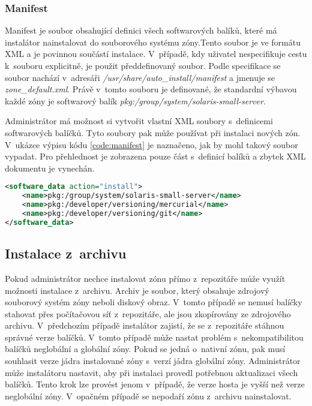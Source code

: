 \subsubsection{Manifest}
\label{chapter:zones:instalation:repozitory:manifest}
Manifest je soubor obsahující definici všech softwarových balíků, které má instalátor nainstalovat do souborového systému zóny.Tento
soubor je ve formátu XML a je povinnou součástí instalace.  V~případě, kdy uživatel nespecifikuje cestu k~souboru explicitně, je použit
předdefinovaný soubor. Podle specifikace \cite{oracle:solaris:zones:manifest} se soubor nachází v~adresáři \textit{/usr/share/auto\_install/manifest}
a jmenuje se \textit{zone\_default.xml}. Právě v~tomto souboru je definované, že standardní výbavou každé zóny je softwarový
balík \textit{pkg:/group/system/solaris-small-server}.

Administrátor má možnost si vytvořit vlastní XML soubory s~definicemi softwarových balíčků. Tyto soubory pak může používat
při instalaci nových zón. V~ukázce výpisu kódu \ref{code:manifest} je naznačeno, jak by mohl takový soubor vypadat.
Pro přehlednost je zobrazena pouze část s~definicí balíků a zbytek XML dokumentu je vynechán.
\begin{lstlisting}[language={XML}, caption={Ukázkový manifest}, label={code:manifest}]
<software_data action="install">    
    <name>pkg:/group/system/solaris-small-server</name>
    <name>pkg:/developer/versioning/mercurial</name>
    <name>pkg:/developer/versioning/git</name>    
</software_data>
\end{lstlisting}
\subsection{Instalace z~archivu}
\label{chapter:zones:instalation:archive}
Pokud administrátor nechce instalovat zónu přímo z~repozitáře může využít možnosti instalace z~archivu. Archiv je soubor, který obsahuje
zdrojový souborový systém zóny neboli diskový obraz. V~tomto případě se nemusí balíčky stahovat přes počítačovou síť z~repozitáře,
ale jsou zkopírovány ze zdrojového archivu. V~předchozím případě instalátor zajistí, že se z~repozitáře stáhnou správné verze
balíčků. V~tomto případě může nastat problém s~nekompatibilitou balíčků neglobální a 
globální zóny. Pokud se jedná o~nativní zónu, pak musí souhlasit verze jádra instalované zóny s~verzí jádra globální zóny. 
Administrátor může instalátoru nastavit, aby při instalaci provedl potřebnou aktualizaci všech balíčků. Tento krok lze provést
jenom v~případě, že verze hosta je vyšší než verze neglobální zóny. V~opačném případě se nepodaří zónu z~archivu nainstalovat.

